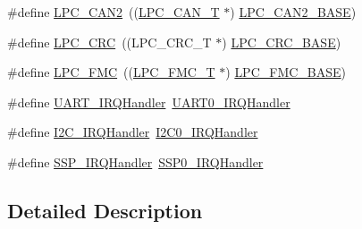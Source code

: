 \begin{DoxyCompactItemize}
\item 
\#define \hyperlink{group__PERIPH__177X__8X__BASE_ga838776140ad5e0156715278f8bb0652d}{L\-P\-C\-\_\-\-C\-A\-N2}~((\hyperlink{structLPC__CAN__T}{L\-P\-C\-\_\-\-C\-A\-N\-\_\-\-T}              $\ast$) \hyperlink{group__PERIPH__407X__8X__BASE_gab9608b3b72dd843a25910dd2a809106b}{L\-P\-C\-\_\-\-C\-A\-N2\-\_\-\-B\-A\-S\-E})
\item 
\#define \hyperlink{group__PERIPH__177X__8X__BASE_gaf01f4835164b4abd2dcc9d89a66ffc21}{L\-P\-C\-\_\-\-C\-R\-C}~((L\-P\-C\-\_\-\-C\-R\-C\-\_\-\-T              $\ast$) \hyperlink{group__PERIPH__407X__8X__BASE_ga6d27804148d49c67065a8cd351ebc7b7}{L\-P\-C\-\_\-\-C\-R\-C\-\_\-\-B\-A\-S\-E})
\item 
\#define \hyperlink{group__PERIPH__177X__8X__BASE_ga406fa416fe50b196b86146ba0b20ba3c}{L\-P\-C\-\_\-\-F\-M\-C}~((\hyperlink{structLPC__FMC__T}{L\-P\-C\-\_\-\-F\-M\-C\-\_\-\-T}              $\ast$) \hyperlink{group__PERIPH__407X__8X__BASE_gaad6b7f57ab13bf5886da624bbb4bcc61}{L\-P\-C\-\_\-\-F\-M\-C\-\_\-\-B\-A\-S\-E})
\item 
\#define \hyperlink{group__PERIPH__177X__8X__BASE_gaf6a20f8c9320377f3713d96ea90bfd10}{U\-A\-R\-T\-\_\-\-I\-R\-Q\-Handler}~\hyperlink{lpc17__uartrb_8c_a1c0544b06d54b198d8c50f507e399a91}{U\-A\-R\-T0\-\_\-\-I\-R\-Q\-Handler}
\item 
\#define \hyperlink{group__PERIPH__177X__8X__BASE_ga78bc9c1986ea5da20688e1db532c5717}{I2\-C\-\_\-\-I\-R\-Q\-Handler}~\hyperlink{lpc17__i2c_8c_a8e817e99d2a59e5f48e4ff0c79e7eef5}{I2\-C0\-\_\-\-I\-R\-Q\-Handler}
\item 
\#define \hyperlink{group__PERIPH__177X__8X__BASE_gac4eb0fc5d2f19b89fa77194876b63df4}{S\-S\-P\-\_\-\-I\-R\-Q\-Handler}~\hyperlink{lpc17__ssp_8c_a56a77444d4b4985ba292102c14c94ed6}{S\-S\-P0\-\_\-\-I\-R\-Q\-Handler}
\end{DoxyCompactItemize}


\subsection{Detailed Description}


